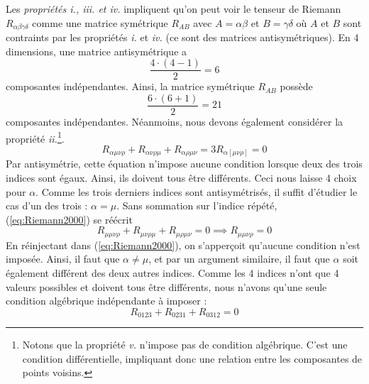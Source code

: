 Les \textit{propriétés i., iii. et iv.} impliquent qu'on peut voir le tenseur de Riemann $R_{\alpha \beta \gamma \delta}$ comme une matrice symétrique $R_{AB}$ avec $A = \alpha \beta$ et $B = \gamma \delta$ où $A$ et $B$ sont contraints par les propriétés \emph{i.} et \emph{iv.} (ce sont des matrices antisymétriques). En 4 dimensions, une matrice antisymétrique a
\begin{equation*}
    \frac{4 \cdot (4-1)}{2} = 6
\end{equation*}
composantes indépendantes. Ainsi, la matrice symétrique $R_{AB}$ possède
\begin{equation*}
    \frac{6 \cdot (6+1)}{2} = 21
\end{equation*}
composantes indépendantes. Néanmoins, nous devons également considérer la propriété \emph{ii.}\footnote{Notons que la propriété \emph{v.} n'impose pas de condition algébrique. C'est une condition différentielle, impliquant donc une relation entre les composantes de points voisins.}.
\begin{equation}
    \label{eq:Riemann2000}
    R_{\alpha \mu \nu \rho} + R_{\alpha \nu \rho \mu} + R_{\alpha \rho \mu \nu}= 3 R_{\alpha[\mu\nu\rho]} = 0
\end{equation}
Par antisymétrie, cette équation n'impose aucune condition lorsque deux des trois indices sont égaux. Ainsi, ils doivent tous être différents. Ceci nous laisse 4 choix pour $\alpha$. Comme les trois derniers indices sont antisymétrisés, il suffit d'étudier le cas d'un des trois : $\alpha = \mu$. Sans sommation sur l'indice répété, (\ref{eq:Riemann2000}) se réécrit 
\begin{equation}
    R_{\mu\mu \nu\rho} + R_{\mu \nu \rho \mu}+ R_{\mu \rho \mu \nu}  = 0 \implies R_{\mu\mu \nu\rho} =0
\end{equation}
En réinjectant dans (\ref{eq:Riemann2000}), on s'apperçoit qu'aucune condition n'est imposée. Ainsi, il faut que $\alpha \neq \mu$, et par un argument similaire, il faut que $\alpha$ soit également différent des deux autres indices. Comme les 4 indices n'ont que 4 valeurs possibles et doivent tous être différents, nous n'avons qu'une seule condition algébrique indépendante à imposer :
\begin{equation}
    R_{0123} + R_{0231} + R_{0312} = 0
\end{equation}
